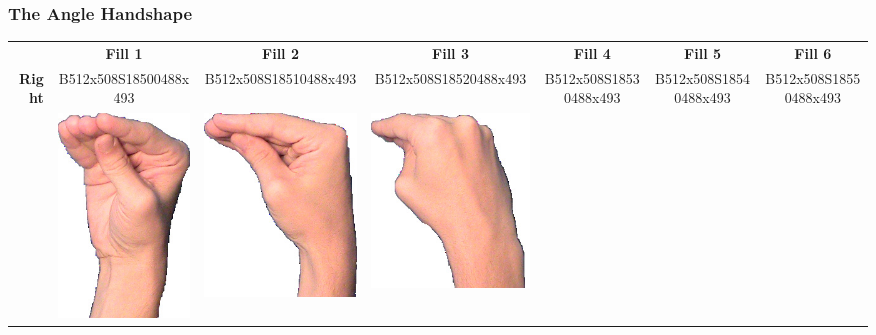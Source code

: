 \documentclass{article}
\begin{document}
\subsubsection{The Angle Handshape}

\begin{center}
\begin{tabular}{r*{6}{c}}
&\textbf{Fill 1}&\textbf{Fill 2}&\textbf{Fill 3}&\textbf{Fill 4}&\textbf{Fill 5}&\textbf{Fill 6}\\
\multirow{2}{*}{\textbf{Right}}&
B512x508S18500488x493&
B512x508S18510488x493&
B512x508S18520488x493&
B512x508S18530488x493&
B512x508S18540488x493&
B512x508S18550488x493\\
&
\includegraphics[scale=0.1]{images/05-21-1.jpg}&
\includegraphics[scale=0.1]{images/05-21-2.jpg}&
\includegraphics[scale=0.1]{images/05-21-3.jpg}&

\end{tabular}
\end{center}
\end{document}
